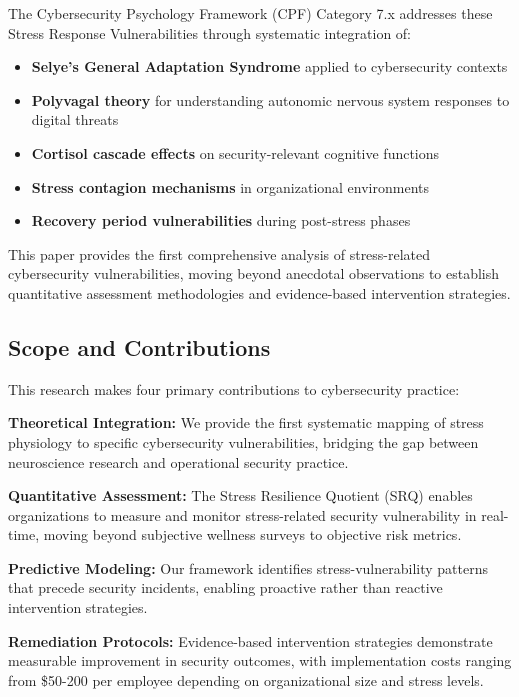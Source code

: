 \documentclass[11pt,a4paper]{article}
\begin{document}
The Cybersecurity Psychology Framework (CPF) Category 7.x addresses these Stress Response Vulnerabilities through systematic integration of:

\begin{itemize}
\item \textbf{Selye's General Adaptation Syndrome} applied to cybersecurity contexts
\item \textbf{Polyvagal theory} for understanding autonomic nervous system responses to digital threats
\item \textbf{Cortisol cascade effects} on security-relevant cognitive functions
\item \textbf{Stress contagion mechanisms} in organizational environments
\item \textbf{Recovery period vulnerabilities} during post-stress phases
\end{itemize}

This paper provides the first comprehensive analysis of stress-related cybersecurity vulnerabilities, moving beyond anecdotal observations to establish quantitative assessment methodologies and evidence-based intervention strategies.

\subsection{Scope and Contributions}

This research makes four primary contributions to cybersecurity practice:

\textbf{Theoretical Integration:} We provide the first systematic mapping of stress physiology to specific cybersecurity vulnerabilities, bridging the gap between neuroscience research and operational security practice.

\textbf{Quantitative Assessment:} The Stress Resilience Quotient (SRQ) enables organizations to measure and monitor stress-related security vulnerability in real-time, moving beyond subjective wellness surveys to objective risk metrics.

\textbf{Predictive Modeling:} Our framework identifies stress-vulnerability patterns that precede security incidents, enabling proactive rather than reactive intervention strategies.

\textbf{Remediation Protocols:} Evidence-based intervention strategies demonstrate measurable improvement in security outcomes, with implementation costs ranging from \$50-200 per employee depending on organizational size and stress levels.
\end{document}
